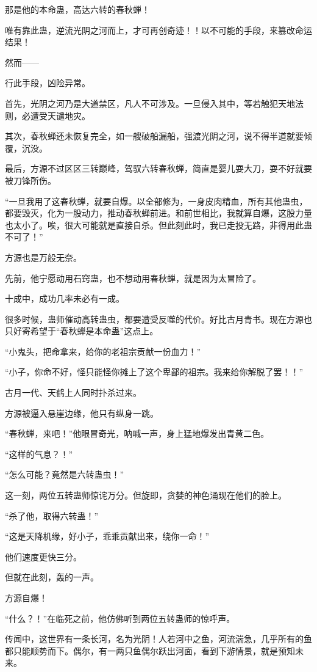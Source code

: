 \begin{this_body}
那是他的本命蛊，高达六转的春秋蝉！

唯有靠此蛊，逆流光阴之河而上，才可再创奇迹！！以不可能的手段，来篡改命运结果！

然而——

行此手段，凶险异常。

首先，光阴之河乃是大道禁区，凡人不可涉及。一旦侵入其中，等若触犯天地法则，必遭受天谴地灾。

其次，春秋蝉还未恢复完全，如一艘破船漏船，强渡光阴之河，说不得半道就要倾覆，沉没。

最后，方源不过区区三转巅峰，驾驭六转春秋蝉，简直是婴儿耍大刀，耍不好就要被刀锋所伤。

“一旦我用了这春秋蝉，就要自爆。以全部修为，一身皮肉精血，所有其他蛊虫，都要毁灭，化为一股动力，推动春秋蝉前进。和前世相比，我就算自爆，这股力量也太小了。唉，很大可能就是直接自杀。但此刻此时，我已走投无路，非得用此蛊不可了！”

方源也是万般无奈。

先前，他宁愿动用石窍蛊，也不想动用春秋蝉，就是因为太冒险了。

十成中，成功几率未必有一成。

很多时候，蛊师催动高转蛊虫，都要遭受反噬的代价。好比古月青书。现在方源也只好寄希望于“春秋蝉是本命蛊”这点上。

“小鬼头，把命拿来，给你的老祖宗贡献一份血力！”

“小子，你命不好，怪只能怪你摊上了这个卑鄙的祖宗。我来给你解脱了罢！！”

古月一代、天鹤上人同时扑杀过来。

方源被逼入悬崖边缘，他只有纵身一跳。

“春秋蝉，来吧！”他眼冒奇光，呐喊一声，身上猛地爆发出青黄二色。

“这样的气息？！”

“怎么可能？竟然是六转蛊虫！”

这一刻，两位五转蛊师惊诧万分。但旋即，贪婪的神色涌现在他们的脸上。

“杀了他，取得六转蛊！”

“这是天降机缘，好小子，乖乖贡献出来，绕你一命！”

他们速度更快三分。

但就在此刻，轰的一声。

方源自爆！

“什么？！”在临死之前，他仿佛听到两位五转蛊师的惊呼声。

传闻中，这世界有一条长河，名为光阴！人若河中之鱼，河流湍急，几乎所有的鱼都只能顺势而下。偶尔，有一两只鱼偶尔跃出河面，看到下游情景，就是预知未来。


\end{this_body}
